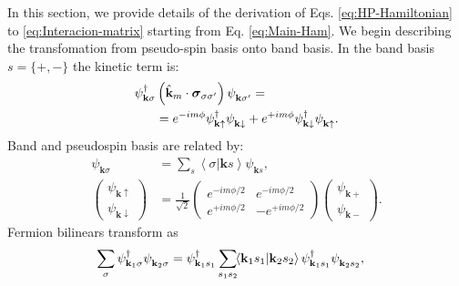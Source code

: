 \documentclass[english,aps,prd,nofootinbib,twocolumn]{revtex4-1}
\begin{document}
In this section, we provide details of the derivation of Eqs. \eqref{eq:HP-Hamiltonian} to \eqref{eq:Interacion-matrix} starting from Eq. \eqref{eq:Main-Ham}. We begin describing the transfomation from pseudo-spin basis onto band basis. In the band basis $s=\{+,-\}$ the kinetic term is:
\begin{equation}
\begin{split}
\psi_{\mathbf{k }\sigma }^{\textcolor{black}{\dagger}}&
\left( \hat{\mathbf{k}}_{m} \cdot 
\boldsymbol{\sigma}_{\sigma\sigma'} \right)
\psi_{\mathbf{k }\sigma'}^{\textcolor{white}{\dagger}}
 = 
\\ &= 
    e^{-im\phi}
    \psi_{\mathbf{k\uparrow  }}^{\textcolor{black}{\dagger}}
    \psi_{\mathbf{k\downarrow}}^{\textcolor{white}{\dagger}} + 
    e^{+im\phi}
    \psi_{\mathbf{k\downarrow}}^{\textcolor{black}{\dagger}}
    \psi_{\mathbf{k\uparrow  }}^{\textcolor{white}{\dagger}} 
    .
\end{split}
\end{equation}
Band and pseudospin basis are related by:
\begin{equation}
\begin{split}
	\psi_{\mathbf{k}\sigma} &= 
	\sum_{s}
	\left\langle \sigma | \mathbf{k }s \right\rangle
	\psi_{\mathbf{k} s },	\\
\begin{pmatrix}
    \psi_{\mathbf{k\uparrow  }}	\\
    \psi_{\mathbf{k\downarrow}}	
\end{pmatrix} &= 
\frac{1}{\sqrt{2}}
\begin{pmatrix}
	 e^{- im\phi /2}	& 
	 e^{- im\phi /2}	\\  
	 e^{+ im\phi /2}	&
    -e^{+ im\phi /2}
\end{pmatrix}
\begin{pmatrix}
	\psi_{\mathbf{k+}}	\\
	\psi_{\mathbf{k-}}	
\end{pmatrix}.
\end{split}
\end{equation}
Fermion bilinears transform as
\begin{equation}
\begin{split}
\sum_{\sigma}
\psi_{\mathbf{k}_{1}\sigma}^{\textcolor{black}{\dagger}}
\psi_{\mathbf{k}_{2}\sigma}^{\textcolor{white}{\dagger}}
&= 
\psi_{\mathbf{k}_{1}s_{1} }^{\textcolor{black}{\dagger}}
\sum_{s_{1}s_{2}}\!\!
\left\langle \mathbf{k}_{1}s_{1} | \mathbf{k}_{2}s_{2} \right\rangle \psi_{\mathbf{k}_{1}s_{1} }^{\textcolor{black}{\dagger}}
\psi_{\mathbf{k}_{2}s_{2} }^{\textcolor{white}{\dagger}},
\end{split}
\end{equation}
\end{document}

